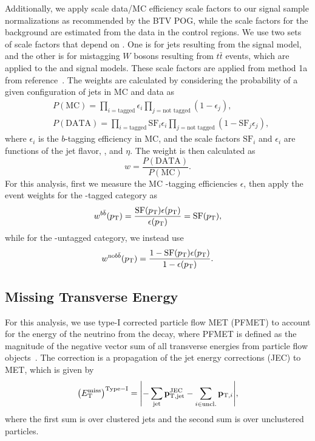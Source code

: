 Additionally, we apply scale data/MC efficiency scale factors to our signal sample normalizations as recommended by the BTV POG, while the scale factors for the background are estimated from the data in the control regions.
We use two sets of scale factors that depend on \ptjet.
One is for \Htobbbar jets resulting from the \WprtoWHtolnubbbar signal model, and the other is for mistagging $W$ bosons resulting from $t\bar{t}$ events, which are applied to the \GBulktoWWtolnuqqbarpr and \WprtoWZtolnuqqbar signal models.
These scale factors are applied from method 1a from reference~\cite{bTaggingEff}.
The weights are calculated by considering the probability of a given configuration of jets in MC and data as
\begin{align}
  & P(\mathrm{MC})=\prod_{i=\text{tagged}}\epsilon_i\prod_{j=\text{not tagged}}(1-\epsilon_j),\\
  & P(\mathrm{DATA})=\prod_{i=\text{tagged}}\mathrm{SF}_i\epsilon_i\prod_{j=\text{not tagged}}(1-\mathrm{SF}_j\epsilon_j),
\end{align}
where $\epsilon_i$ is the $b$-tagging efficiency in MC, and the scale factors $\mathrm{SF}_i$ and $\epsilon_i$ are functions of the jet flavor, \pt, and $\eta$.
The weight is then calculated as
\begin{equation}
  w=\frac{P(\mathrm{DATA})}{P(\mathrm{MC})}.
\end{equation}
For this analysis, first we measure the MC \bbbar-tagging efficiencies $\epsilon$, then apply the event weights for the \bbbar-tagged category as
\begin{equation}
  w^{b\bar{b}}(p_\mathrm{T})=\frac{\mathrm{SF}(p_\mathrm{T})\epsilon(p_\mathrm{T})}{\epsilon(p_\mathrm{T})}=\mathrm{SF}(p_\mathrm{T}),
\end{equation}
while for the \bbbar-untagged category, we instead use
\begin{equation}
  w^{\mathrm{no}b\bar{b}}(p_\mathrm{T})=\frac{1-\mathrm{SF}(p_\mathrm{T})\epsilon(p_\mathrm{T})}{1-\epsilon(p_\mathrm{T})}.
\end{equation}

\subsection{Missing Transverse Energy}

For this analysis, we use type-I corrected particle flow MET (PFMET) to account for the energy of the neutrino from the \Wlep decay, where PFMET is defined as the magnitude of the negative vector sum of all transverse energies from particle flow objects~\cite{Sirunyan:2019kia}. %
The correction is a propagation of the jet energy corrections (JEC) to MET, which is given by
\begin{equation}
  \EtmissTI=\vqty{-\sum_\mathrm{jet}\vb{p}_\mathrm{T,jet}^\mathrm{JEC}-\sum_{i\in\mathrm{uncl.}}\vb{p}_{\mathrm{T},i}},
\end{equation}
where the first sum is over clustered jets and the second sum is over unclustered particles.

